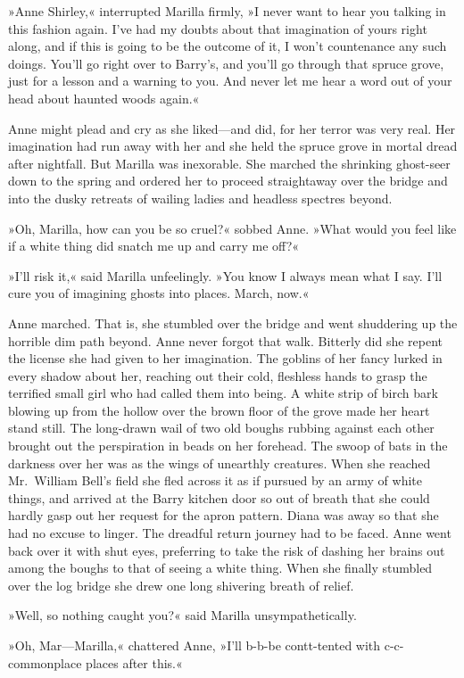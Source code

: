 »Anne Shirley,« interrupted Marilla firmly, »I never want to hear you talking in this fashion again. I've had my doubts about that imagination of yours right along, and if this is going to be the outcome of it, I won't countenance any such doings. You'll go right over to Barry's, and you'll go through that spruce grove, just for a lesson and a warning to you. And never let me hear a word out of your head about haunted woods again.«

Anne might plead and cry as she liked—and did, for her terror was very real. Her imagination had run away with her and she held the spruce grove in mortal dread after nightfall. But Marilla was inexorable. She marched the shrinking ghost-seer down to the spring and ordered her to proceed straightaway over the bridge and into the dusky retreats of wailing ladies and headless spectres beyond.

»Oh, Marilla, how can you be so cruel?« sobbed Anne. »What would you feel like if a white thing did snatch me up and carry me off?«

»I'll risk it,« said Marilla unfeelingly. »You know I always mean what I say. I'll cure you of imagining ghosts into places. March, now.«

Anne marched. That is, she stumbled over the bridge and went shuddering up the horrible dim path beyond. Anne never forgot that walk. Bitterly did she repent the license she had given to her imagination. The goblins of her fancy lurked in every shadow about her, reaching out their cold, fleshless hands to grasp the terrified small girl who had called them into being. A white strip of birch bark blowing up from the hollow over the brown floor of the grove made her heart stand still. The long-drawn wail of two old boughs rubbing against each other brought out the perspiration in beads on her forehead. The swoop of bats in the darkness over her was as the wings of unearthly creatures. When she reached Mr.~William Bell's field she fled across it as if pursued by an army of white things, and arrived at the Barry kitchen door so out of breath that she could hardly gasp out her request for the apron pattern. Diana was away so that she had no excuse to linger. The dreadful return journey had to be faced. Anne went back over it with shut eyes, preferring to take the risk of dashing her brains out among the boughs to that of seeing a white thing. When she finally stumbled over the log bridge she drew one long shivering breath of relief.

»Well, so nothing caught you?« said Marilla unsympathetically.

»Oh, Mar—Marilla,« chattered Anne, »I'll b-b-be contt-tented with c-c-commonplace places after this.«